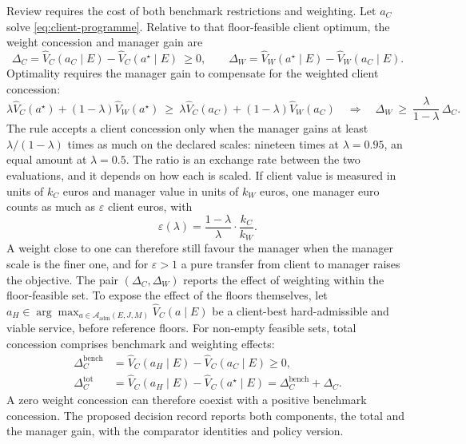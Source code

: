 \documentclass[oneside,10pt,english]{swissi}
\begin{document}
Review requires the cost of both benchmark restrictions and weighting. Let $a_C$ solve \eqref{eq:client-programme}. Relative to that floor-feasible client optimum, the weight concession and manager gain are
\begin{equation}
 \Delta_C=\widehat V_C(a_C\mid E)-\widehat V_C(a^\star\mid E)\ \ge0,\qquad
 \Delta_W=\widehat V_W(a^\star\mid E)-\widehat V_W(a_C\mid E).
 \label{eq:concession}
\end{equation}
Optimality requires the manager gain to compensate for the weighted client concession:
\begin{equation}
 \lambda\widehat V_C(a^\star)+(1-\lambda)\widehat V_W(a^\star)\ \ge\
 \lambda\widehat V_C(a_C)+(1-\lambda)\widehat V_W(a_C)
 \quad\Longrightarrow\quad
 \Delta_W\ \ge\ \frac{\lambda}{1-\lambda}\,\Delta_C .
 \label{eq:exchange-rate}
\end{equation}
The rule accepts a client concession only when the manager gains at least $\lambda/(1-\lambda)$ times as much on the declared scales: nineteen times at $\lambda=0.95$, an equal amount at $\lambda=0.5$. The ratio is an exchange rate between the two evaluations, and it depends on how each is scaled. If client value is measured in units of $k_C$ euros and manager value in units of $k_W$ euros, one manager euro counts as much as $\varepsilon$ client euros, with
\begin{equation}
 \varepsilon(\lambda)=\frac{1-\lambda}{\lambda}\cdot\frac{k_C}{k_W}.
 \label{eq:euro-rate}
\end{equation}
A weight close to one can therefore still favour the manager when the manager scale is the finer one, and for $\varepsilon>1$ a pure transfer from client to manager raises the objective. The pair $(\Delta_C,\Delta_W)$ reports the effect of weighting within the floor-feasible set. To expose the effect of the floors themselves, let $a_H\in\arg\max_{a\in\mathcal A_{\mathrm{adm}}(E,J,M)}\widehat V_C(a\mid E)$ be a client-best hard-admissible and viable service, before reference floors. For non-empty feasible sets, total concession comprises benchmark and weighting effects:
\begin{equation}
 \begin{aligned}
 \Delta_C^{\mathrm{bench}}&=\widehat V_C(a_H\mid E)-\widehat V_C(a_C\mid E)\ge0,\\
 \Delta_C^{\mathrm{tot}}&=\widehat V_C(a_H\mid E)-\widehat V_C(a^\star\mid E)
 =\Delta_C^{\mathrm{bench}}+\Delta_C .
 \end{aligned}
 \label{eq:total-concession}
\end{equation}
A zero weight concession can therefore coexist with a positive benchmark concession. The proposed decision record reports both components, the total and the manager gain, with the comparator identities and policy version.
\end{document}
